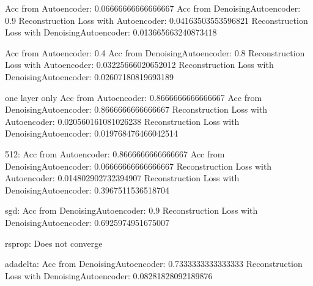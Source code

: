 Acc from Autoencoder: 0.06666666666666667
Acc from DenoisingAutoencoder: 0.9
Reconstruction Loss with Autoencoder: 0.04163503553596821
Reconstruction Loss with DenoisingAutoencoder: 0.013665663240873418

Acc from Autoencoder: 0.4
Acc from DenoisingAutoencoder: 0.8
Reconstruction Loss with Autoencoder: 0.03225666020652012
Reconstruction Loss with DenoisingAutoencoder: 0.02607180819693189

one layer only
Acc from Autoencoder: 0.8666666666666667
Acc from DenoisingAutoencoder: 0.8666666666666667
Reconstruction Loss with Autoencoder: 0.020560161081026238
Reconstruction Loss with DenoisingAutoencoder: 0.019768476466042514

512:
Acc from Autoencoder: 0.8666666666666667
Acc from DenoisingAutoencoder: 0.06666666666666667
Reconstruction Loss with Autoencoder: 0.014802902732394907
Reconstruction Loss with DenoisingAutoencoder: 0.3967511536518704

sgd:
Acc from DenoisingAutoencoder: 0.9
Reconstruction Loss with DenoisingAutoencoder: 0.6925974951675007

rsprop:
Does not converge

adadelta:
Acc from DenoisingAutoencoder: 0.7333333333333333
Reconstruction Loss with DenoisingAutoencoder: 0.08281828092189876
